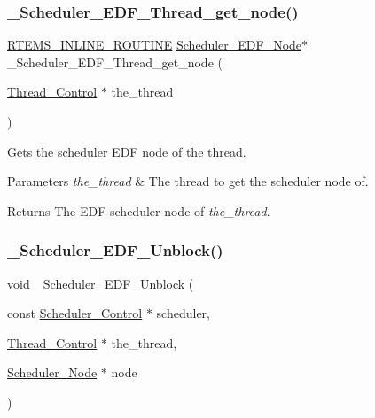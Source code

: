 \subsubsection{\texorpdfstring{\_Scheduler\_EDF\_Thread\_get\_node()}{\_Scheduler\_EDF\_Thread\_get\_node()}}
{\footnotesize\ttfamily \mbox{\hyperlink{group__RTEMSScoreBaseDefs_gac216239df231d5dbd15e3520b0b9313f}{R\+T\+E\+M\+S\+\_\+\+I\+N\+L\+I\+N\+E\+\_\+\+R\+O\+U\+T\+I\+NE}} \mbox{\hyperlink{structScheduler__EDF__Node}{Scheduler\+\_\+\+E\+D\+F\+\_\+\+Node}}$\ast$ \+\_\+\+Scheduler\+\_\+\+E\+D\+F\+\_\+\+Thread\+\_\+get\+\_\+node (\begin{DoxyParamCaption}\item[{\mbox{\hyperlink{struct__Thread__Control}{Thread\+\_\+\+Control}} $\ast$}]{the\+\_\+thread }\end{DoxyParamCaption})}



Gets the scheduler E\+DF node of the thread. 


\begin{DoxyParams}{Parameters}
{\em the\+\_\+thread} & The thread to get the scheduler node of.\\
\hline
\end{DoxyParams}
\begin{DoxyReturn}{Returns}
The E\+DF scheduler node of {\itshape the\+\_\+thread}. 
\end{DoxyReturn}
\mbox{\label{group__RTEMSScoreSchedulerEDF_ga1c6a885d1cbf890d31be7c539db7c12e}} 
\subsubsection{\texorpdfstring{\_Scheduler\_EDF\_Unblock()}{\_Scheduler\_EDF\_Unblock()}}
{\footnotesize\ttfamily void \+\_\+\+Scheduler\+\_\+\+E\+D\+F\+\_\+\+Unblock (\begin{DoxyParamCaption}\item[{const \mbox{\hyperlink{struct__Scheduler__Control}{Scheduler\+\_\+\+Control}} $\ast$}]{scheduler,  }\item[{\mbox{\hyperlink{struct__Thread__Control}{Thread\+\_\+\+Control}} $\ast$}]{the\+\_\+thread,  }\item[{\mbox{\hyperlink{structScheduler__Node}{Scheduler\+\_\+\+Node}} $\ast$}]{node }\end{DoxyParamCaption})}



